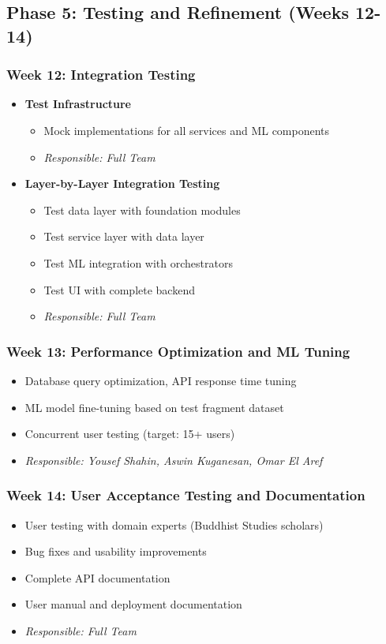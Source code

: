 \documentclass[12pt, titlepage]{article}
\begin{document}
\subsection{Phase 5: Testing and Refinement (Weeks 12-14)}

\subsubsection{Week 12: Integration Testing}
\begin{itemize}
    \item \textbf{Test Infrastructure}
    \begin{itemize}
        \item Mock implementations for all services and ML components
        \item \textit{Responsible: Full Team}
    \end{itemize}
    \item \textbf{Layer-by-Layer Integration Testing}
    \begin{itemize}
        \item Test data layer with foundation modules
        \item Test service layer with data layer
        \item Test ML integration with orchestrators
        \item Test UI with complete backend
        \item \textit{Responsible: Full Team}
    \end{itemize}
\end{itemize}

\subsubsection{Week 13: Performance Optimization and ML Tuning}
\begin{itemize}
    \item Database query optimization, API response time tuning
    \item ML model fine-tuning based on test fragment dataset
    \item Concurrent user testing (target: 15+ users)
    \item \textit{Responsible: Yousef Shahin, Aswin Kuganesan, Omar El Aref}
\end{itemize}

\subsubsection{Week 14: User Acceptance Testing and Documentation}
\begin{itemize}
    \item User testing with domain experts (Buddhist Studies scholars)
    \item Bug fixes and usability improvements
    \item Complete API documentation
    \item User manual and deployment documentation
    \item \textit{Responsible: Full Team}
\end{itemize}
\end{document}
